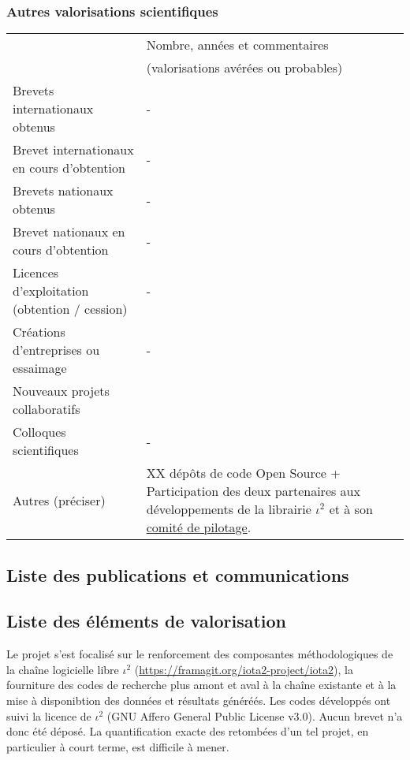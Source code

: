 \subsubsection*{Autres valorisations scientifiques} 
\begin{table}[htbp]
\small
    \centering
    \begin{tabular}{|p{5.5cm}|p{6cm}|}
    \hline
& Nombre, années et commentaires \\
&(valorisations avérées ou probables)\\\hline
Brevets internationaux obtenus&-\\\hline
Brevet internationaux en cours d’obtention&- \\\hline
Brevets nationaux obtenus&- \\\hline
Brevet nationaux en cours d’obtention&- \\\hline
Licences d’exploitation (obtention / cession)&- \\\hline
Créations d’entreprises ou essaimage&- \\\hline
Nouveaux projets collaboratifs &\clement{??} \\\hline
Colloques scientifiques&- \\\hline
Autres (préciser)& XX dépôts de code Open Source + Participation des deux partenaires aux développements de la librairie $\iota^2$ et à son \href{https://framagit.org/iota2-project/iota2/-/wikis/Project-Steering-Committee}{comité de pilotage}. \\
\hline
    \end{tabular}
    \label{tab:valo_other}
\end{table}


\subsection{Liste des publications et communications}

\printbibliography[keyword={LASTIG-CESBIO-j},title={Journaux}]
\printbibliography[keyword={LASTIG-CESBIO-c},title={Conférences}]
\printbibliography[keyword={LASTIG-CESBIO-a},title={Autres communications}]

\subsection{Liste des éléments de valorisation}
Le projet s'est focalisé sur le renforcement des composantes méthodologiques de la chaîne logicielle libre $\iota^2$ (\href{https://framagit.org/iota2-project/iota2}{https://framagit.org/iota2-project/iota2}), la fourniture des codes de recherche plus amont et aval à la chaîne existante et à la mise à disponibtion des données et résultats généréés. Les codes développés ont suivi la licence de $\iota^2$ (GNU Affero General Public License v3.0). Aucun brevet n'a donc été déposé. La quantification exacte des retombées d'un tel projet, en particulier à court terme, est difficile à mener.

